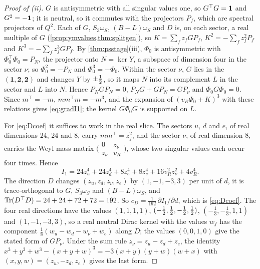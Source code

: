 \begin{proof}[Proof of (ii)]
$G$ is antisymmetric with all singular values one, so $G^\top G=\mathbf 1$ and $G^2=-\mathbf 1$; it is neutral, so it commutes with the projectors $P_f$,
which are spectral projectors of $Q^2$. Each of $G$, $S_3\omega_S$, $(B\!-\!L)\omega_S$ and $D$ is, on each sector, a real multiple of $G$
(\cref{prop:ymvalues,thm:splitgen}), so $K=\sum_fz_fGP_f$, $K^2=-\sum_fz_f^2P_f$ and $K^3=-\sum_fz_f^3GP_f$. By \cref{thm:psstage}(iii),
$\Phi_0$ is antisymmetric with $\Phi_0^\top\Phi_0=P_N$, the projector onto $N=\ker Y$, a subspace of dimension four in the sector $\nu$; so
$\Phi_0^2=-P_N$ and $\Phi_0^3=-\Phi_0$. Within the sector $\nu$, $G$ lies in the $(\mathbf1,\mathbf2,\mathbf2)$ and changes $Y$ by $\pm\tfrac12$,
so it maps $N$ into its complement $L$ in the sector and $L$ into $N$. Hence $P_NGP_N=0$, $P_NG+GP_N=GP_\nu$ and $\Phi_0G\Phi_0=0$. Since
$m^\top=-m$, $mm^\top m=-m^3$, and the expansion of $(v_R\Phi_0+K)^3$ with these relations gives \cref{eq:gradI1}; the kernel $G\Phi_0G$ is
supported on $L$.

For \cref{eq:Dcoef} it suffices to work in the real slice. The sectors $u$, $d$ and $e$, of real dimensions $24$, $24$ and $8$, carry
$mm^\top=z_f^2$, and the sector $\nu$, of real dimension $8$, carries the Weyl mass matrix
$\bigl(\begin{smallmatrix}0&z_\nu\\z_\nu&v_R\end{smallmatrix}\bigr)$, whose two singular values each occur four times. Hence
\[
I_1=24z_u^4+24z_d^4+8z_e^4+8z_\nu^4+16v_R^2z_\nu^2+4v_R^4 .
\]
The direction $D$ changes $(z_u,z_d,z_\nu,z_e)$ by $(1,-1,-3,3)$ per unit of $d$, it is trace-orthogonal to $G$, $S_3\omega_S$ and
$(B\!-\!L)\omega_S$, and $\operatorname{Tr}(D^\top D)=24+24+72+72=192$. So $c_D=\tfrac1{192}\,\partial I_1/\partial d$, which is \cref{eq:Dcoef}. The four
real directions have the values $(1,1,1,1)$, $(-\tfrac12,\tfrac12,-\tfrac12,\tfrac12)$, $(-\tfrac13,-\tfrac13,1,1)$ and $(1,-1,-3,3)$, so a real neutral
Dirac kernel with the values $w_f$ has the component $\tfrac18(w_u-w_d-w_\nu+w_e)$ along $D$; the values $(0,0,1,0)$ give the stated form of
$GP_\nu$. Under the sum rule $z_\nu=z_u-z_d+z_e$, the identity $x^3+y^3+w^3-(x+y+w)^3=-3(x+y)(y+w)(w+x)$ with $(x,y,w)=(z_u,-z_d,z_e)$
gives the last form.
\end{proof}


